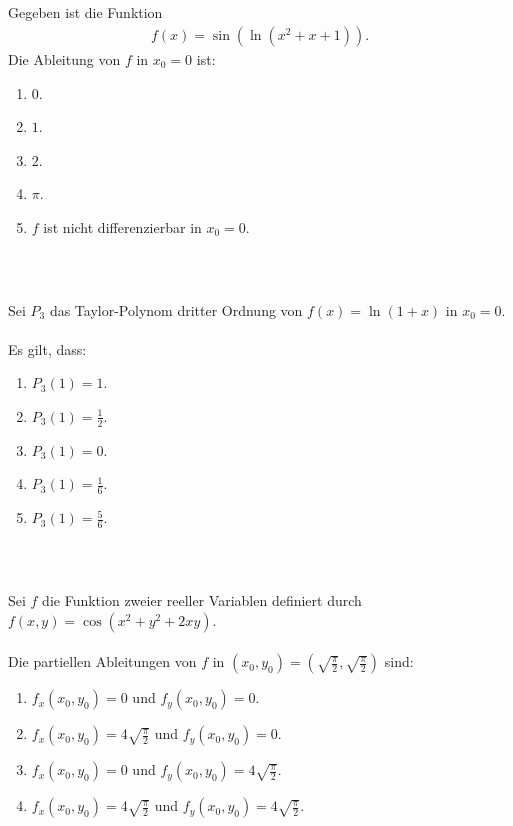 \subsection*{}
Gegeben ist die Funktion
\begin{align*}
	f(x) = \sin(\ln(x^2 + x + 1)).
\end{align*}
Die Ableitung von $f$ in $x_0 = 0 $ ist:
\renewcommand{\labelenumi}{(\alph{enumi})}
\begin{enumerate}
	\item 
	$ 0$.
	\item
	$ 1 $.
	\item
	$ 2 $.
	\item
	$ \pi $.
	\item
	$f$ ist nicht differenzierbar in $x_0 = 0$.
\end{enumerate}
\ \\
\subsection*{}
Sei $P_3$ das Taylor-Polynom dritter Ordnung von $f(x) = \ln(1+ x) $ in $x_0 = 0$.\\
\\
Es gilt, dass:
\renewcommand{\labelenumi}{(\alph{enumi})}
\begin{enumerate}
\item 
$P_3(1) = 1 $.
\item 
$P_3(1) = \frac{1 }{2}$.
\item
$P_3(1) =  0$.
\item
$P_3(1) = \frac{1 }{6}$.
\item
$P_3(1) = \frac{5 }{6}$.
\end{enumerate}
\ 
\subsection*{}
Sei $f$ die Funktion zweier reeller Variablen definiert durch $f(x,y) = \cos(x^2 +y^2 + 2xy).$\\
\\
Die partiellen Ableitungen von $f$ in $(x_0, y_0) = \left(\sqrt{\frac{\pi}{2}}, \sqrt{\frac{\pi}{2}}\right)$ sind:
\renewcommand{\labelenumi}{(\alph{enumi})}
\begin{enumerate}
\item 
$f_x(x_0,y_0) = 0$ und $f_y(x_0,y_0) = 0$.
\item
$f_x(x_0,y_0) = 4 \sqrt{\frac{\pi}{2}} $ und $f_y(x_0,y_0) = 0$.
\item
$f_x(x_0,y_0) = 0 $ und $f_y(x_0,y_0) = 4 \sqrt{\frac{\pi}{2}}$.
\item
$f_x(x_0,y_0) = 4 \sqrt{\frac{\pi}{2}} $ und $f_y(x_0,y_0) = 4 \sqrt{\frac{\pi}{2}}$.
\end{enumerate}
\ \\
